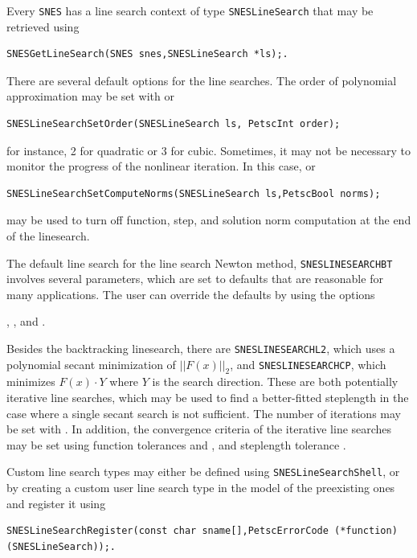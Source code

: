 Every \lstinline{SNES} has a line search context of type \lstinline{SNESLineSearch} that may be retrieved using
\begin{lstlisting}
SNESGetLineSearch(SNES snes,SNESLineSearch *ls);.
\end{lstlisting}

There are several default options for the line searches.  The order of polynomial approximation may be set
with  or
\begin{lstlisting}
SNESLineSearchSetOrder(SNESLineSearch ls, PetscInt order);
\end{lstlisting}
for instance, 2 for quadratic or 3 for cubic. Sometimes, it may not be necessary to monitor the progress of the
nonlinear iteration.  In this case,  or
\begin{lstlisting}
SNESLineSearchSetComputeNorms(SNESLineSearch ls,PetscBool norms);
\end{lstlisting}
may be used to turn off function, step, and solution norm computation at the end of the linesearch.

The default line search for the line search Newton method, \lstinline{SNESLINESEARCHBT} involves several parameters, which are set
to defaults that are reasonable for many applications.  The user can override the defaults by using the options

, 
, and 
\break{}. 

Besides the backtracking linesearch, there are \lstinline{SNESLINESEARCHL2}, which uses a polynomial secant minimization of
$||F(x)||_2$, and \lstinline{SNESLINESEARCHCP}, which minimizes $F(x) \cdot Y$ where $Y$ is the search direction.  These are both
potentially iterative line searches, which may be used to find a better-fitted steplength in the case where a single
secant search is not sufficient.  The number of iterations may be set with .  In addition,
the convergence criteria of the iterative line searches may be set using function tolerances 
and , and steplength tolerance .

Custom line search types may either be defined using \lstinline{SNESLineSearchShell}, or by creating a custom user line search type
in the model of the preexisting ones and register it using
\begin{lstlisting}
SNESLineSearchRegister(const char sname[],PetscErrorCode (*function)(SNESLineSearch));.
\end{lstlisting}

